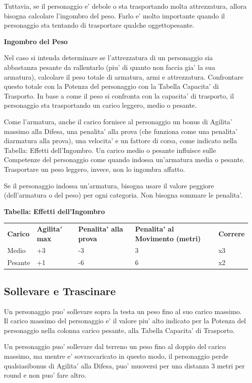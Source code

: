 \documentclass[a4paper,11pt,twoside,openany]{book}
\begin{document}
Tuttavia, se il personaggio e' debole o sta trasportando molta attrezzatura, allora bisogna calcolare l'ingombro del peso. Farlo e' molto importante quando il personaggio sta tentando di trasportare qualche oggettopesante. 

\textbf{Ingombro del Peso}

Nel caso si intenda determinare se l'attrezzatura di un personaggio sia abbastanza pesante da rallentarlo (piu' di quanto non faccia gia' la sua armatura), calcolare il peso totale di armatura, armi e attrezzatura. Confrontare questo totale con la Potenza del personaggio con la Tabella Capacita' di Trasporto. In base a come il peso si confronta con la capacita' di trasporto, il personaggio sta trasportando un carico leggero, medio o pesante.

Come l'armatura, anche il carico fornisce al personaggio un bonus di Agilita' massimo alla Difesa, una penalita' alla prova (che funziona come una penalita' diarmatura alla prova), una velocita' e un fattore di corsa, come indicato nella Tabella: Effetti dell'Ingombro. Un carico medio o pesante influisce sulle Competenze del personaggio come quando indossa un'armatura media o pesante. Trasportare un peso leggero, invece, non lo ingombra affatto.

Se il personaggio indossa un'armatura, bisogna usare il valore peggiore (dell'armatura o del peso) per ogni categoria. Non bisogna sommare le penalita'.

\bigskip

\textbf{Tabella: Effetti dell'Ingombro}

\begin{tabular}{lllll}
\toprule
\textbf{Carico} & \textbf{Agilita' max} & \textbf{Penalita' alla prova} & \textbf{Penalita' al Movimento (metri)} & \textbf{Correre}\tabularnewline
Medio & +3 & -3 & 3 & x3\tabularnewline
Pesante & +1 & -6 & 6 & x2\tabularnewline
\end{tabular}

\subsection{Sollevare e Trascinare}

Un personaggio puo' sollevare sopra la testa un peso fino al suo carico massimo. Il carico massimo del personaggio e' il valore piu' alto indicato per la Potenza del personaggio nella colonna carico pesante, alla Tabella Capacita' di Trasporto.

Un personaggio puo' sollevare dal terreno un peso fino al doppio del carico massimo, ma mentre e' sovraccaricato in questo modo, il personaggio perde qualsiasibonus di Agilita' alla Difesa, puo' muoversi per una distanza 3 metri per round e non puo' fare altro.
\end{document}
